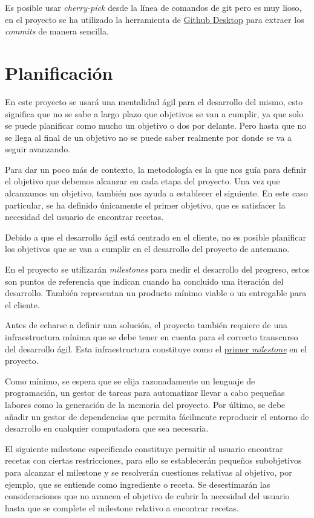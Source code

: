 Es posible usar \emph{cherry-pick} desde la línea de comandos de git pero es muy lioso, en el proyecto se ha utilizado la herramienta de \href{https://desktop.github.com/}{Github Desktop} para extraer los \emph{commits} de manera sencilla.

\section{Planificación}
En este proyecto se usará una mentalidad ágil para el desarrollo del mismo, esto significa que no se sabe a largo plazo que objetivos se van a cumplir, ya que solo se puede planificar como mucho un objetivo o dos por delante. Pero hasta que no se llega al final de un objetivo no se puede saber realmente por donde se va a seguir avanzando.

Para dar un poco más de contexto, la metodología es la que nos guía para definir el objetivo que debemos alcanzar en cada etapa del proyecto. Una vez que alcanzamos un objetivo, también nos ayuda a establecer el siguiente. En este caso particular, se ha definido únicamente el primer objetivo, que es satisfacer la necesidad del usuario de encontrar recetas. 

Debido a que el desarrollo ágil está centrado en el cliente, no es posible planificar los objetivos que se van a cumplir en el desarrollo del proyecto de antemano.  

En el proyecto se utilizarán \emph{milestones} para medir el desarrollo del progreso, estos son puntos de referencia que indican cuando ha concluido una iteración del desarrollo. También representan un producto mínimo viable o un entregable para el cliente.\cite{milestone2022}

Antes de echarse a definir una solución, el proyecto también requiere de una infraestructura mínima que se debe tener en cuenta para el correcto transcurso del desarrollo ágil. Esta infraestructura constituye como el \href{https://github.com/Slowmybrosh/TFG-DietPlanner/milestone/10}{primer \emph{milestone}} en el proyecto.

Como mínimo, se espera que se elija razonadamente un lenguaje de programación, un gestor de tareas para automatizar llevar a cabo pequeñas labores como la generación de la memoria del proyecto. Por último, se debe añadir un gestor de dependencias que permita fácilmente reproducir el entorno de desarrollo en cualquier computadora que sea necesaria.

El siguiente milestone especificado constituye permitir al usuario encontrar recetas con ciertas restricciones, para ello se establecerán pequeños subobjetivos para alcanzar el milestone y se resolverán cuestiones relativas al objetivo, por ejemplo, que se entiende como ingrediente o receta. Se desestimarán las consideraciones que no avancen el objetivo de cubrir la necesidad del usuario hasta que se complete el milestone relativo a encontrar recetas.

